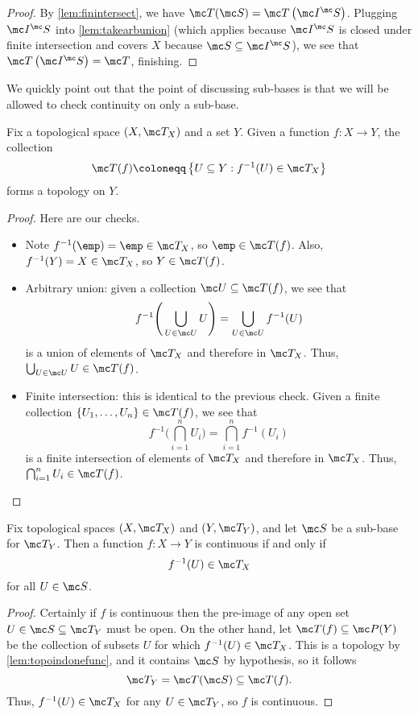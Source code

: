 \documentclass[../notes.tex]{subfiles}
\begin{document}
\begin{proof}
	By \autoref{lem:finintersect}, we have $\mc T(\mc S)=\mc T\left(\mc I^\mc S\right)$. Plugging $\mc I^\mc S$ into \autoref{lem:takearbunion} (which applies because $\mc I^\mc S$ is closed under finite intersection and covers $X$ because $\mc S\subseteq\mc I^\mc S$), we see that $\mc T\left(\mc I^\mc S\right)=\mc T$, finishing.
\end{proof}
We quickly point out that the point of discussing sub-bases is that we will be allowed to check continuity on only a sub-base.
\begin{lemma} \label{lem:topoindonefunc}
	Fix a topological space $(X,\mc T_X)$ and a set $Y$. Given a function $f\colon X\to Y$, the collection
	\[\mc T(f)\coloneqq\left\{U\subseteq Y:f^{-1}(U)\in\mc T_X\right\}\]
	forms a topology on $Y$.
\end{lemma}
\begin{proof}
	Here are our checks.
	\begin{itemize}
		\item Note $f^{-1}(\emp)=\emp\in\mc T_X$, so $\emp\in\mc T(f)$. Also, $f^{-1}(Y)=X\in\mc T_X$, so $Y\in\mc T(f)$.
		\item Arbitrary union: given a collection $\mc U\subseteq\mc T(f)$, we see that
		\[f^{-1}\Bigg(\bigcup_{U\in\mc U}U\Bigg)=\bigcup_{U\in\mc U}f^{-1}(U)\]
		is a union of elements of $\mc T_X$ and therefore in $\mc T_X$. Thus, $\bigcup_{U\in\mc U}U\in\mc T(f)$.
		\item Finite intersection: this is identical to the previous check. Given a finite collection $\{U_1,\ldots,U_n\}\in\mc T(f)$, we see that
		\[f^{-1}\Bigg(\bigcap_{i=1}^nU_i\Bigg)=\bigcap_{i=1}^nf^{-1}(U_i)\]
		is a finite intersection of elements of $\mc T_X$ and therefore in $\mc T_X$. Thus, $\bigcap_{i=1}^nU_i\in\mc T(f)$.
		\qedhere
	\end{itemize}
\end{proof}
\begin{proposition} \label{prop:checkonsubbase}
	Fix topological spaces $(X,\mc T_X)$ and $(Y,\mc T_Y)$, and let $\mc S$ be a sub-base for $\mc T_Y$. Then a function $f\colon X\to Y$ is continuous if and only if
	\[f^{-1}(U)\in\mc T_X\]
	for all $U\in\mc S$.
\end{proposition}
\begin{proof}
	Certainly if $f$ is continuous then the pre-image of any open set $U\in\mc S\subseteq\mc T_Y$ must be open. On the other hand, let $\mc T(f)\subseteq\mc P(Y)$ be the collection of subsets $U$ for which $f^{-1}(U)\in\mc T_X$. This is a topology by \autoref{lem:topoindonefunc}, and it contains $\mc S$ by hypothesis, so it follows
	\[\mc T_Y=\mc T(\mc S)\subseteq\mc T(f).\]
	Thus, $f^{-1}(U)\in\mc T_X$ for any $U\in\mc T_Y$, so $f$ is continuous.
\end{proof}
\end{document}
